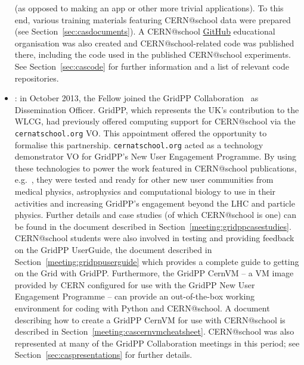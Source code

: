 \begin{itemize}
(as opposed to making an app or other more trivial applications).
To this end, various training materials featuring CERN@school
data were prepared (see Section~\ref{sec:casdocuments}).
A CERN@school \href{http://github.com}{GitHub} educational
organisation was also created and CERN@school-related code was published there,
including the code used in the published CERN@school experiments.
See Section~\ref{sec:cascode} for further information and a list of
relevant code repositories.
%
\item {}:
in October 2013, the Fellow joined the
GridPP Collaboration~\cite{GridPP2006,GridPP2009} as Dissemination
Officer.
%
GridPP, which represents the UK's contribution to the
\ac{WLCG}, had previously offered computing support for
CERN@school via the \texttt{cernatschool.org} \ac{VO}.
This appointment offered the opportunity to formalise this
partnership. \texttt{cernatschool.org} acted as a
technology demonstrator \ac{VO} for GridPP's
New User Engagement Programme.
By using these technologies
to power the work featured in CERN@school publications,
e.g.~\cite{Whyntie2015a}, they were tested and ready for
other new user communities
from medical physics, astrophysics and computational biology
to use in their activities and increasing GridPP's engagement
beyond the \ac{LHC} and particle physics.
Further details and case studies (of which CERN@school is one)
can be found in the document described in
Section~\ref{meeting:gridppcasestudies}.
CERN@school students were also involved in testing and providing
feedback on the GridPP UserGuide, the document described
in Section~\ref{meeting:gridppuserguide} which provides a
complete guide to getting on the Grid with GridPP.
Furthermore, the GridPP CernVM -- a \ac{VM} image provided
by \acs{CERN} configured for use with the GridPP New User
Engagement Programme -- can provide an out-of-the-box
working environment for coding with Python and
CERN@school. A document describing how to create a GridPP CernVM
for use with CERN@school is described in Section~\ref{meeting:cascernvmcheatsheet}.
CERN@school was also represented at many of the GridPP Collaboration
meetings in this period; see Section~\ref{sec:caspresentations}
for further details.


\end{itemize}
